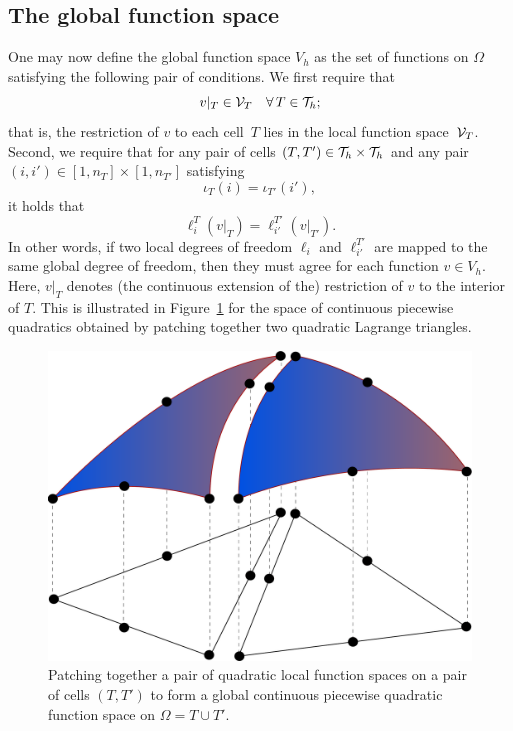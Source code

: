 \subsection{The global function space}
One may now define the global function space $V_h$ as the set of
functions on $\Omega$ satisfying the following pair of conditions. We
first require that
\begin{equation}
  v |_T \in \mathcal{V}_T \quad \forall\, T \in \mathcal{T}_h;
\end{equation}
that is, the restriction of $v$ to each cell~$T$ lies in the local
function space~$\mathcal{V}_T$. Second, we require that for any pair
of cells $(T, T') \in \mathcal{T}_h \times \mathcal{T}_h$ and any pair~$(i, i') \in
[1,n_T] \times [1,n_{T'}]$ satisfying
\begin{equation}
  \iota_T(i) = \iota_{T'}(i'),
\end{equation}
it holds that
\begin{equation} \label{eq:constraint}
  \ell^T_i(v|_T) = \ell^{T'}_{i'}(v|_{T'}).
\end{equation}
In other words, if two local degrees of freedom $\ell_i$ and
$\ell^{T'}_{i'}$ are mapped to the same global degree of freedom, then
they must agree for each function $v \in V_h$. Here, $v|_T$ denotes
(the continuous extension of the) restriction of $v$ to the interior
of $T$. This is illustrated in Figure~\ref{fig:femspace} for the space
of continuous piecewise quadratics obtained by patching together two
quadratic Lagrange triangles.

\begin{figure}
  \centering
  \includegraphics[width=\largefig]{chapters/kirby-7/pdf/femspace.pdf}
  \caption{Patching together a pair of quadratic local function
    spaces on a pair of cells $(T, T')$ to form a global continuous
    piecewise quadratic function space on $\Omega = T \cup T'$.}
  \label{fig:femspace}
\end{figure}

